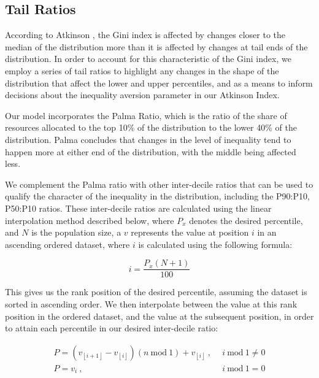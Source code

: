 \documentclass[conference]{IEEEtran}
\begin{document}
\subsection{Tail Ratios}

According to Atkinson \cite{atkinson1970measurement}, the Gini index is affected by changes closer to the median of the distribution more than it is affected by changes at tail ends of the distribution.  In order to account for this characteristic of the Gini index, we employ a series of tail ratios to highlight any changes in the shape of the distribution that affect the lower and upper percentiles, and as a means to inform decisions about the inequality aversion parameter in our Atkinson Index.

Our model incorporates the Palma Ratio\cite{palma2011homogeneous}, which is the ratio of the share of resources allocated to the top 10\% of the distribution to the lower 40\% of the distribution.  Palma concludes that changes in the level of inequality tend to happen more at either end of the distribution, with the middle being affected less.

We complement the Palma ratio with other inter-decile ratios that can be used to qualify the character of the inequality in the distribution, including the P90:P10, P50:P10 ratios.  These inter-decile ratios are calculated using the linear interpolation method \cite{frost2023B} described below, where $P_x$ denotes the desired percentile, and $N$ is the population size, a $v$ represents the value at position $i$ in an ascending ordered dataset, where $i$ is calculated using the following formula:

\[ i = \frac{P_x\left( N+1 \right)}{100} \]

This gives us the rank position of the desired percentile, assuming the dataset is sorted in ascending order.  We then interpolate between the value at this rank position in the ordered dataset, and the value at the subsequent position, in order to attain each percentile in our desired inter-decile ratio:

\begin{align*}
P = \left( v_{\left\lfloor i+1 \right\rfloor} - v_{\left\lfloor i \right\rfloor}\right)(n \ \text{mod} \ 1) + v_{\left\lfloor i \right\rfloor} \ , & \ \ i \ \text{mod} \ 1 \neq 0 \\
P = v_i \ , & \ \ i \ \text{mod} \ 1 = 0
\end{align*}

\vspace{8pt}
\end{document}
